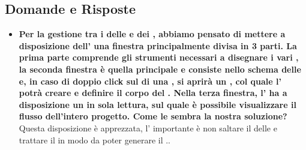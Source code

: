 	  \subsection{Domande e Risposte}
	   \begin{itemize}
	   
	   	   	\item 
	   		\textbf{Per la gestione tra i  delle  e dei , abbiamo pensato di mettere a disposizione dell' una finestra principalmente divisa in 3 parti. La prima parte comprende gli strumenti necessari a disegnare i vari , la seconda finestra è quella principale e consiste nello schema delle  e, in caso di doppio click sul  di una , si aprirà un , col quale l' potrà creare e definire il corpo del . Nella terza finestra, l' ha a disposizione un  in sola lettura, sul quale è possibile visualizzare il flusso dell'intero progetto. Come le sembra la nostra soluzione? } \\
	    	\justifying     		
Questa disposizione è apprezzata, l' importante è non saltare il  delle  e trattare il  in modo da poter generare il ..\\


\end{itemize}
